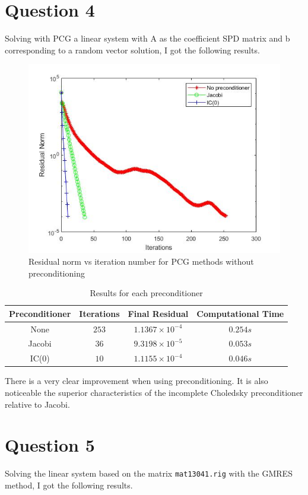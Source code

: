 \documentclass[a4paper, 11pt]{article}
\begin{document}
		
		\section*{Question 4}	
			Solving with PCG a linear system with A as the coefficient SPD matrix and b corresponding to a random vector solution, I got the following results.
				
			\begin{figure}[H]
				\centering
				\includegraphics[width=.6\linewidth]{ex4.jpg}
				\caption{Residual norm vs iteration number for PCG methods without preconditioning}
				\label{fig:ex4}
			\end{figure}
		
			\begin{table}[H]
			\centering
			\begin{tabular}{c|c|c|c}
				\textbf{Preconditioner} &  \textbf{Iterations} 	& \textbf{Final Residual} 		& \textbf{Computational Time} 	\\ \hline
				None					& 			$253$ 		& $ 1.1367 \times 10^{-4} $ 	& $ 0.254 s $	\\ \hline
				Jacobi					& 			$36$ 		& $ 9.3198 \times 10^{-5} $ 	& $ 0.053 s $	\\ \hline		
				IC(0)					& 			$10$		& $ 1.1155 \times 10^{-4} $		& $	0.046 s $	\\
			\end{tabular}
			\caption{Results for each preconditioner}
			\label{table:ex4}
			\end{table}
		
			There is a very clear improvement when using preconditioning.
			It is also noticeable the superior characteristics of the incomplete Choledsky preconditioner relative to Jacobi.
		
		\section*{Question 5}
			Solving the linear system based on the matrix \texttt{mat13041.rig} with the GMRES method, I got the following results.
			
\end{document}
